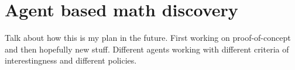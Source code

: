 \section{Agent based math discovery}
Talk about how this is my plan in the future. First working on proof-of-concept and then hopefully new stuff.
Different agents working with different criteria of interestingness and different policies.
